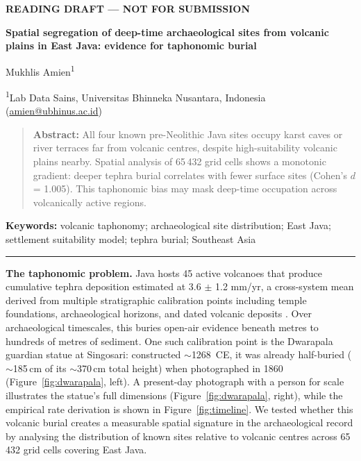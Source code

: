 \documentclass[12pt]{article}
\begin{document}
\begin{center}
{\small\color{red}\textbf{READING DRAFT --- NOT FOR SUBMISSION}}

\vspace{6pt}

{\large\bfseries Spatial segregation of deep-time archaeological sites from volcanic plains in East Java: evidence for taphonomic burial}

\vspace{6pt}

Mukhlis Amien\textsuperscript{1}

\vspace{4pt}

{\small\textsuperscript{1}Lab Data Sains, Universitas Bhinneka Nusantara, Indonesia (\href{mailto:amien@ubhinus.ac.id}{amien@ubhinus.ac.id})}
\end{center}

\begin{quote}
\small\textbf{Abstract:} All four known pre-Neolithic Java sites occupy karst caves or river terraces far from volcanic centres, despite high-suitability volcanic plains nearby. Spatial analysis of 65\,432 grid cells shows a monotonic gradient: deeper tephra burial correlates with fewer surface sites (Cohen's $d$ = 1.005). This taphonomic bias may mask deep-time occupation across volcanically active regions.
\end{quote}

\textbf{Keywords:} volcanic taphonomy; archaeological site distribution; East Java; settlement suitability model; tephra burial; Southeast Asia

\vspace{6pt}
\hrule
\vspace{6pt}


\textbf{The taphonomic problem.}
Java hosts 45 active volcanoes that produce cumulative tephra deposition estimated at 3.6 $\pm$ 1.2 mm/yr, a cross-system mean derived from multiple stratigraphic calibration points including temple foundations, archaeological horizons, and dated volcanic deposits \citep{Amien2026a}.
Over archaeological timescales, this buries open-air evidence beneath metres to hundreds of metres of sediment.
One such calibration point is the Dwarapala guardian statue at Singosari: constructed $\sim$1268~CE, it was already half-buried ($\sim$185\,cm of its $\sim$370\,cm total height) when photographed in 1860 (Figure~\ref{fig:dwarapala}, left). A present-day photograph with a person for scale illustrates the statue's full dimensions (Figure~\ref{fig:dwarapala}, right), while the empirical rate derivation is shown in Figure~\ref{fig:timeline}.
We tested whether this volcanic burial creates a measurable spatial signature in the archaeological record by analysing the distribution of known sites relative to volcanic centres across 65\,432 grid cells covering East Java.
\end{document}
